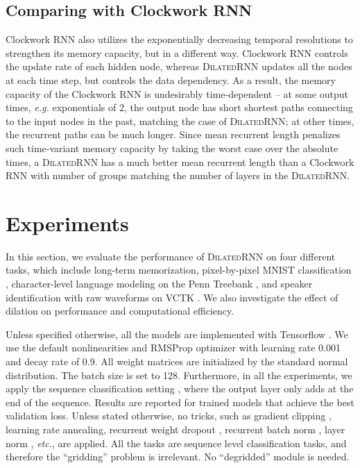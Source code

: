 \documentclass{article}
\newcommand{\algname}{\textsc{DilatedRNN }}
\newcommand{\algnamens}{\textsc{DilatedRNN}}
\begin{document}
\subsection{Comparing with Clockwork RNN}
\label{subsec:compare_CWRNN}

Clockwork RNN \cite{koutnik2014clockwork} also utilizes the exponentially decreasing temporal resolutions to strengthen its memory capacity, but in a different way. Clockwork RNN controls the update rate of each hidden node, whereas \algname updates all the nodes at each time step, but controls the data dependency. As a result, the memory capacity of the Clockwork RNN is undesirably time-dependent -- at some output times, \emph{e.g.} exponentials of 2, the output node has short shortest paths connecting to the input nodes in the past, matching the case of \algnamens; at other times, the recurrent paths can be much longer. Since mean recurrent length penalizes such time-variant memory capacity by taking the worst case over the absolute times, a \algname has a much better mean recurrent length than a Clockwork RNN with number of groups matching the number of layers in the \algnamens.

\section{Experiments}
\label{sect:exp}
In this section, we evaluate the performance of \algname on four different tasks, which include long-term memorization, pixel-by-pixel MNIST classification \cite{lecun1998gradient}, character-level language modeling on the Penn Treebank \cite{marcus1993building}, and speaker identification with raw waveforms on VCTK \cite{yamagishi2012vctk}. We also investigate the effect of dilation on performance and computational efficiency.

Unless specified otherwise, all the models are implemented with Tensorflow \cite{abadi2016tensorflow}.  We use the default nonlinearities and RMSProp optimizer \cite{tieleman2012lecture} with learning rate 0.001 and decay rate of 0.9.  All weight matrices are initialized by the standard normal distribution.  The batch size is set to 128.   Furthermore, in all the experiments, we apply the sequence classification setting \cite{xing2010brief}, where the output layer only adds at the end of the sequence.  Results are reported for trained models that achieve the best validation loss.   Unless stated otherwise, no tricks, such as gradient clipping \cite{pascanu2013difficulty}, learning rate annealing, recurrent weight dropout \cite{semeniuta2016recurrent}, recurrent batch norm \cite{semeniuta2016recurrent}, layer norm \cite{ba2016layer}, {\em etc.}, are applied. All the tasks are sequence level classification tasks, and therefore the ``gridding'' problem \cite{yu2017dilated} is irrelevant. No ``degridded'' module is needed.
\end{document}
